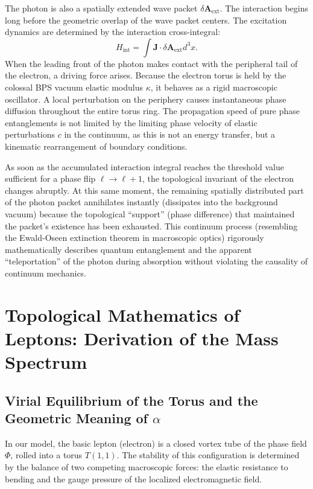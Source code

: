 \documentclass[12pt,a4paper]{article}
\begin{document}
The photon is also a spatially extended wave packet $\delta \mathbf{A}_{\text{ext}}$. The interaction begins long before the geometric overlap of the wave packet centers. The excitation dynamics are determined by the interaction cross-integral:
\begin{equation}
	H_{\text{int}} = \int \mathbf{J} \cdot \delta \mathbf{A}_{\text{ext}} d^3x.
\end{equation}
When the leading front of the photon makes contact with the peripheral tail of the electron, a driving force arises. Because the electron torus is held by the colossal BPS vacuum elastic modulus $\kappa$, it behaves as a rigid macroscopic oscillator. A local perturbation on the periphery causes instantaneous phase diffusion throughout the entire torus ring. 
The propagation speed of pure phase entanglements is not limited by the limiting phase velocity of elastic perturbations $c$ in the continuum, as this is not an energy transfer, but a kinematic rearrangement of boundary conditions.

As soon as the accumulated interaction integral reaches the threshold value sufficient for a phase flip $\ell \to \ell + 1$, the topological invariant of the electron changes abruptly. At this same moment, the remaining spatially distributed part of the photon packet annihilates instantly (dissipates into the background vacuum) because the topological ``support'' (phase difference) that maintained the packet's existence has been exhausted. 
This continuum process (resembling the Ewald-Oseen extinction theorem in macroscopic optics) rigorously mathematically describes quantum entanglement and the apparent ``teleportation'' of the photon during absorption without violating the causality of continuum mechanics.

\section{Topological Mathematics of Leptons: Derivation of the Mass Spectrum}

\subsection{Virial Equilibrium of the Torus and the Geometric Meaning of $\alpha$}
In our model, the basic lepton (electron) is a closed vortex tube of the phase field $\Phi$, rolled into a torus $T(1,1)$. The stability of this configuration is determined by the balance of two competing macroscopic forces: the elastic resistance to bending and the gauge pressure of the localized electromagnetic field.
\end{document}
